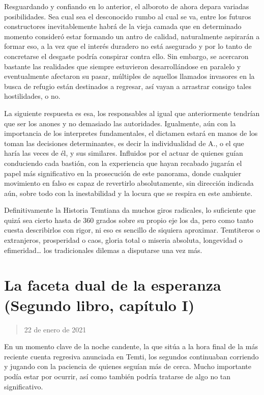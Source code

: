 \documentclass[
]{book}
\begin{document}
Resguardando y confiando en lo anterior, el alboroto de ahora depara variadas posibilidades. Sea cual sea el desconocido rumbo al cual se va, entre los futuros constructores inevitablemente habrá de la vieja camada que en determinado momento consideró estar formando un antro de calidad, naturalmente aspirarán a formar eso, a la vez que el interés duradero no está asegurado y por lo tanto de concretarse el desgaste podría conspirar contra ello. Sin embargo, se acercaron bastante las realidades que siempre estuvieron desarrollándose en paralelo y eventualmente afectaron su pasar, múltiples de aquellos llamados invasores en la busca de refugio están destinados a regresar, así vayan a arrastrar consigo tales hostilidades, o no.

La siguiente respuesta es esa, los responsables al igual que anteriormente tendrían que ser los anones y no demasiado las autoridades. Igualmente, aún con la importancia de los interpretes fundamentales, el dictamen estará en manos de los toman las decisiones determinantes, es decir la individualidad de A., o el que haría las veces de él, y sus similares. Influidos por el actuar de quienes guían conduciendo cada bastión, con la experiencia que hayan recabado jugarán el papel más significativo en la prosecución de este panorama, donde cualquier movimiento en falso es capaz de revertirlo absolutamente, sin dirección indicada aún, sobre todo con la inestabilidad y la locura que se respira en este ambiente.

Definitivamente la Historia Temtiana da muchos giros radicales, lo suficiente que quizá sea cierto hasta de 360 grados sobre su propio eje los da, pero como tanto cuesta describirlos con rigor, ni eso es sencillo de siquiera aproximar. Temtiteros o extranjeros, prosperidad o caos, gloria total o miseria absoluta, longevidad o efimeridad\ldots{} los tradicionales dilemas a disputarse una vez más.

\hypertarget{la-faceta-dual-de-la-esperanza-segundo-libro-capuxedtulo-i}{%
\section{La faceta dual de la esperanza (Segundo libro, capítulo I)}\label{la-faceta-dual-de-la-esperanza-segundo-libro-capuxedtulo-i}}

\begin{quote}
22 de enero de 2021
\end{quote}

En un momento clave de la noche candente, la que sitúa a la hora final de la más reciente cuenta regresiva anunciada en Temti, los segundos continuaban corriendo y jugando con la paciencia de quienes seguían más de cerca. Mucho importante podía estar por ocurrir, así como también podría tratarse de algo no tan significativo.
\end{document}
